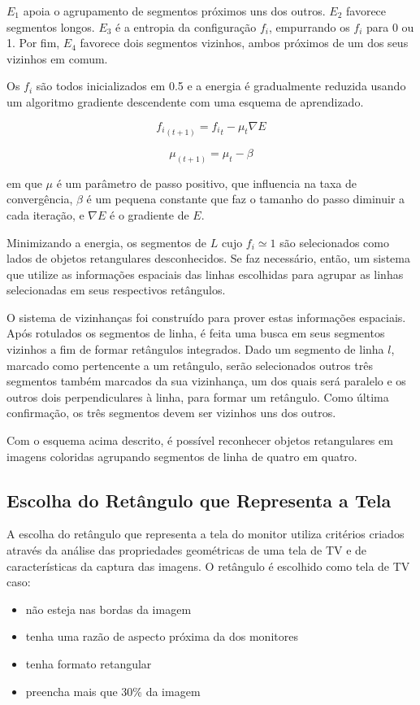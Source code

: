 $E_1$ apoia o agrupamento de segmentos próximos uns dos outros. $E_2$ favorece segmentos longos. $E_3$ é a entropia da configuração ${f_i}$, empurrando os ${f_i}$ para 0 ou 1. Por fim, $E_4$ favorece dois segmentos vizinhos, ambos próximos de um dos seus vizinhos em comum.

Os $ {f_i} $ são todos inicializados em 0.5 e a energia é gradualmente reduzida usando um algoritmo gradiente descendente com uma esquema de aprendizado.

$$ {f_i}_{(t+1)} = {f_i}_t - \mu_t \nabla E $$

$$ \mu_{(t+1)} = \mu_t - \beta $$

em que $\mu$ é um parâmetro de passo positivo, que influencia na taxa de convergência, $\beta$ é um pequena constante que faz o tamanho do passo diminuir a cada iteração, e $ \nabla E $ é o gradiente de $E$.

Minimizando a energia, os segmentos de $L$ cujo $f_i \simeq 1$ são selecionados como lados de objetos retangulares desconhecidos. Se faz necessário, então, um sistema que utilize as informações espaciais das linhas escolhidas para agrupar as linhas selecionadas em seus respectivos retângulos.

O sistema de vizinhanças foi construído para prover estas informações espaciais. Após rotulados os segmentos de linha, é feita uma busca em seus segmentos vizinhos a fim de formar retângulos integrados. Dado um segmento de linha $l$, marcado como pertencente a um retângulo, serão selecionados outros três segmentos também marcados da sua vizinhança, um dos quais será paralelo e os outros dois perpendiculares à linha, para formar um retângulo. Como última confirmação, os três segmentos devem ser vizinhos uns dos outros.

Com o esquema acima descrito, é possível reconhecer objetos retangulares em imagens coloridas agrupando segmentos de linha de quatro em quatro.

\subsection {Escolha do Retângulo que Representa a Tela}

A escolha do retângulo que representa a tela do monitor utiliza critérios criados através da análise das propriedades geométricas de uma tela de TV e de características da captura das imagens. O retângulo é escolhido como tela de TV caso:

\begin{itemize}
\item não esteja nas bordas da imagem
\item  tenha uma razão de aspecto próxima da dos monitores
\item tenha formato retangular
\item preencha mais que 30\% da imagem
\end{itemize}

